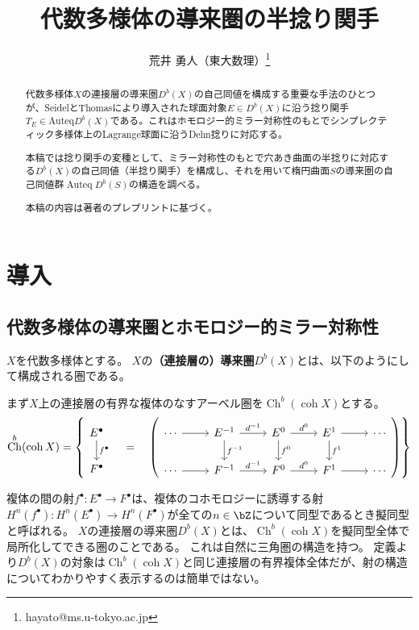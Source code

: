 \documentclass[uplatex,a4paper,dvipdfmx]{jsarticle}
\title{代数多様体の導来圏の半捻り関手}
\author{荒井 勇人（東大数理）\thanks{hayato@ms.u-tokyo.ac.jp}}
\date{}
\numberwithin{equation}{section}
\theoremstyle{definition}
\DeclareMathOperator{\Auteq}{\mathrm{Auteq}}
\DeclareMathOperator{\Ch}{\mathrm{Ch}}
\DeclareMathOperator{\coh}{\mathrm{coh}}
\begin{document}
\maketitle

\begin{abstract}
	代数多様体$X$の連接層の導来圏$D^b(X)$の自己同値を構成する重要な手法のひとつが、SeidelとThomasにより導入された球面対象$E \in D^b(X)$に沿う捻り関手$T_E \in \mathrm{Auteq} D^b(X)$である。これはホモロジー的ミラー対称性のもとでシンプレクティック多様体上のLagrange球面に沿うDehn捻りに対応する。

	本稿では捻り関手の変種として、ミラー対称性のもとで穴あき曲面の半捻りに対応する$D^b(X)$の自己同値（半捻り関手）を構成し、それを用いて楕円曲面$S$の導来圏の自己同値群$\Auteq D^b(S)$の構造を調べる。

	本稿の内容は著者のプレプリント\cite{2023arXiv230212501A}に基づく。
\end{abstract}

\section{導入}
\subsection{代数多様体の導来圏とホモロジー的ミラー対称性}
$X$を代数多様体とする。
$X$の\textbf{（連接層の）導来圏}$D^b(X)$とは、以下のようにして構成される圏である。

まず$X$上の連接層の有界な複体のなすアーベル圏を$\Ch^b(\coh X)$とする。
\begin{equation}
	\Ch^b(\coh X) = \left\{
	  \begin{tikzcd}
		  E^\bullet \arrow[d, "f^\bullet", name=F]\\
		  F^\bullet
	  \end{tikzcd}
	  \quad = \quad
	  \left(
	  \begin{tikzcd}
			  \cdots \arrow[r] &E^{-1} \arrow[r, "d^{-1}"]\arrow[d, "f^{-1}"] &E^0 \arrow[r, "d^{0}"]\arrow[d, "f^{0}"] &E^1 \arrow[d, "f^{1}"] \arrow[r] &\cdots\\
			  \cdots \arrow[r] &F^{-1} \arrow[r, "d^{-1}"] &F^0 \arrow[r, "d^{0}"] &F^1\arrow[r] &\cdots
		  \end{tikzcd}
	  \right)
	\right\}
\end{equation}


複体の間の射$f^\bullet \colon E^\bullet \to F^\bullet$は、複体のコホモロジーに誘導する射$H^n(f^\bullet) \colon H^n(E^\bullet) \to H^n(F^\bullet)$が全ての$n \in \bZ$について同型であるとき擬同型と呼ばれる。
$X$の連接層の導来圏$D^b(X)$とは、$\Ch^b(\coh X)$を擬同型全体で局所化してできる圏のことである。
これは自然に三角圏の構造を持つ。
定義より$D^b(X)$の対象は$\Ch^b(\coh X)$と同じ連接層の有界複体全体だが、射の構造についてわかりやすく表示するのは簡単ではない。
\end{document}
